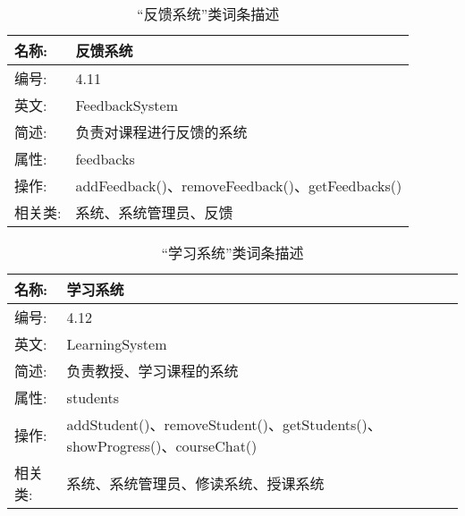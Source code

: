 \begin{table}[H]  
\caption{“反馈系统”类词条描述}  
\begin{center}  
    \begin{tabular}{l p{11cm}} 
        \hline
        \quad 名称:  &  反馈系统 \\
        \hline
        \quad 编号:  & 4.11 \\
        \hline
        \quad 英文:  &  FeedbackSystem \\
        \hline
        \quad 简述:  & 负责对课程进行反馈的系统 \\
        \hline
        \quad 属性:  & feedbacks\\
        \hline
        \quad 操作:  & addFeedback()、removeFeedback()、getFeedbacks()\\
        \hline
        \quad 相关类:  & 系统、系统管理员、反馈 \\
        \hline
    \end{tabular}
\end{center}
\end{table}

\begin{table}[H]  
\caption{“学习系统”类词条描述}  
\begin{center}  
    \begin{tabular}{l p{11cm}} 
        \hline
        \quad 名称:  &  学习系统 \\
        \hline
        \quad 编号:  & 4.12 \\
        \hline
        \quad 英文:  &  LearningSystem \\
        \hline
        \quad 简述:  & 负责教授、学习课程的系统 \\
        \hline
        \quad 属性:  & students\\
        \hline
        \quad 操作:  & addStudent()、removeStudent()、getStudents()、showProgress()、courseChat()
\\
        \hline
        \quad 相关类:  & 系统、系统管理员、修读系统、授课系统 \\
        \hline
    \end{tabular}
\end{center}
\end{table}

